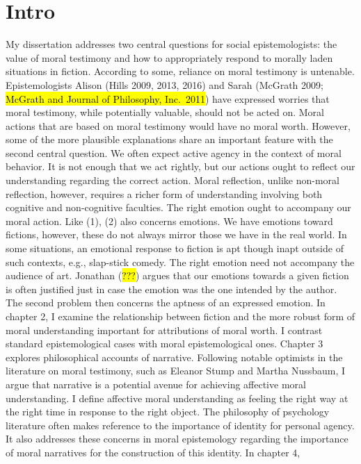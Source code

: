 \documentclass[
  letterpaper,
  DIV=11,
  numbers=noendperiod]{scrartcl}
\theoremstyle{remark}
\begin{document}
\section{Intro}\label{intro}

My dissertation addresses two central questions for social
epistemologists: the value of moral testimony and how to appropriately
respond to morally laden situations in fiction. According to some,
reliance on moral testimony is untenable. Epistemologists Alison (Hills
2009, 2013, 2016) and Sarah (McGrath 2009; \hl{McGrath and Journal of
Philosophy, Inc.~2011}) have expressed worries that moral testimony,
while potentially valuable, should not be acted on. Moral actions that
are based on moral testimony would have no moral worth. However, some of
the more plausible explanations share an important feature with the
second central question. We often expect active agency in the context of
moral behavior. It is not enough that we act rightly, but our actions
ought to reflect our understanding regarding the correct action. Moral
reflection, unlike non-moral reflection, however, requires a richer form
of understanding involving both cognitive and non-cognitive faculties.
The right emotion ought to accompany our moral action. Like (1), (2)
also concerns emotions. We have emotions toward fictions, however, these
do not always mirror those we have in the real world. In some
situations, an emotional response to fiction is apt though inapt outside
of such contexts, e.g., slap-stick comedy. The right emotion need not
accompany the audience of art. Jonathan (\hl{???}) argues that our
emotions towards a given fiction is often justified just in case the
emotion was the one intended by the author. The second problem then
concerns the aptness of an expressed emotion. In chapter 2, I examine
the relationship between fiction and the more robust form of moral
understanding important for attributions of moral worth. I contrast
standard epistemological cases with moral epistemological ones. Chapter
3 explores philosophical accounts of narrative. Following notable
optimists in the literature on moral testimony, such as Eleanor Stump
and Martha Nussbaum, I argue that narrative is a potential avenue for
achieving affective moral understanding. I define affective moral
understanding as feeling the right way at the right time in response to
the right object. The philosophy of psychology literature often makes
reference to the importance of identity for personal agency. It also
addresses these concerns in moral epistemology regarding the importance
of moral narratives for the construction of this identity. In chapter 4,
\end{document}
